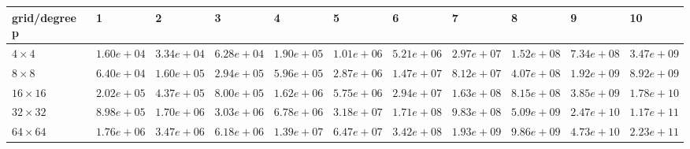 \begin{tabular}{lllllllllll}
\hline
 grid/degree p   & 1          & 2          & 3          & 4          & 5          & 6          & 7          & 8          & 9          & 10         \\
\hline
 $4 \times 4$    & $1.60e+04$ & $3.34e+04$ & $6.28e+04$ & $1.90e+05$ & $1.01e+06$ & $5.21e+06$ & $2.97e+07$ & $1.52e+08$ & $7.34e+08$ & $3.47e+09$ \\
 $8 \times 8$    & $6.40e+04$ & $1.60e+05$ & $2.94e+05$ & $5.96e+05$ & $2.87e+06$ & $1.47e+07$ & $8.12e+07$ & $4.07e+08$ & $1.92e+09$ & $8.92e+09$ \\
 $16 \times 16$  & $2.02e+05$ & $4.37e+05$ & $8.00e+05$ & $1.62e+06$ & $5.75e+06$ & $2.94e+07$ & $1.63e+08$ & $8.15e+08$ & $3.85e+09$ & $1.78e+10$ \\
 $32 \times 32$  & $8.98e+05$ & $1.70e+06$ & $3.03e+06$ & $6.78e+06$ & $3.18e+07$ & $1.71e+08$ & $9.83e+08$ & $5.09e+09$ & $2.47e+10$ & $1.17e+11$ \\
 $64 \times 64$  & $1.76e+06$ & $3.47e+06$ & $6.18e+06$ & $1.39e+07$ & $6.47e+07$ & $3.42e+08$ & $1.93e+09$ & $9.86e+09$ & $4.73e+10$ & $2.23e+11$ \\
\hline
\end{tabular}